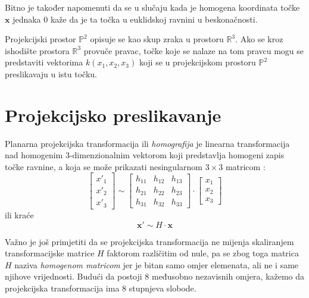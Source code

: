 Bitno je također napomenuti da se u slučaju kada je homogena koordinata točke $\mathbf{x}$ jednaka $0$ kaže da je ta točka u euklidskoj ravnini u beskonačnosti.

Projekcijski prostor $\mathbb{P}^2$ opisuje se kao skup zraka u prostoru $\mathbb{R}^3$. Ako se kroz ishodište prostora $\mathbb{R}^3$ provuče pravac, točke koje se nalaze na tom pravcu mogu se predstaviti vektorima $k(x_1, x_2, x_3)$ koji se u projekcijskom prostoru $\mathbb{P}^2$ preslikavaju u istu točku.

\section{Projekcijsko preslikavanje}
\label{sec:projPresl}

Planarna projekcijska transformacija ili \textit{homografija} je linearna transformacija nad homogenim 3-dimenzionalnim vektorom koji predstavlja homogeni zapis točke ravnine, a koja se može prikazati nesingularnom $3 \times 3$ matricom \citep{Hartley2004}:
\begin{equation}
	\label{eq:transLong}
	\left[\begin{matrix}
		x'_1 \\
		x'_2 \\
		x'_3
	\end{matrix}
	\right] \sim \left[\begin{matrix}
		h_{11} & h_{12} & h_{13} \\
		h_{21} & h_{22} & h_{23} \\
		h_{31} & h_{32} & h_{33}
	\end{matrix}
	\right]
	\cdot
	\left[
	\begin{matrix}
		x_1 \\
		x_2 \\
		x_3
	\end{matrix}
	\right]
\end{equation}
ili kraće
\begin{equation}
	\mathbf{x'} \sim H \cdot \mathbf{x}
	\label{eq:transShort}
\end{equation}

Važno je još primjetiti da se projekcijska transformacija ne mijenja skaliranjem transformacijske matrice $H$ faktorom različitim od nule, pa se zbog toga matrica $H$ naziva \textit{homogenom matricom} jer je bitan samo omjer elemenata, ali ne i same njihove vrijednosti. Budući da postoji 8 međusobno nezavisnih omjera, kažemo da projekcijska transformacija ima 8 stupnjeva slobode.

